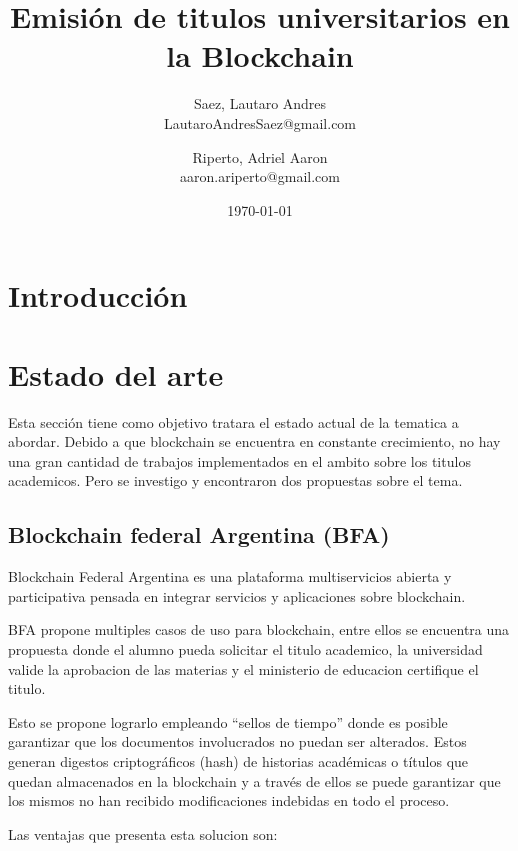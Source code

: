 \documentclass[11pt,a4paper]{article}
\title{ 
    Emisión de titulos universitarios
    en la Blockchain
}
\author{
    Saez, Lautaro Andres \\ \small{ LautaroAndresSaez@gmail.com } 
    \and 
    Riperto, Adriel Aaron \\ \small{ aaron.ariperto@gmail.com } 
}
\date{\today}
\begin{document}
    \maketitle

    \section{Introducción}

    \section{Estado del arte}

        Esta sección tiene como objetivo tratara el estado actual de la tematica a abordar.
        Debido a que blockchain se encuentra en constante crecimiento, no hay una gran cantidad 
        de trabajos implementados en el ambito sobre los titulos academicos. Pero se investigo 
        y encontraron dos propuestas sobre el tema. %

        \subsection{Blockchain federal Argentina (BFA)}


        Blockchain Federal Argentina es una plataforma multiservicios abierta y participativa pensada en integrar servicios y aplicaciones
        sobre blockchain. %
        
        BFA propone multiples casos de uso para blockchain, entre ellos se encuentra una propuesta donde el alumno pueda solicitar
        el titulo academico, la universidad valide la aprobacion de las materias y el ministerio de educacion certifique el titulo.

        Esto se propone lograrlo empleando “sellos de tiempo” donde es posible garantizar que los documentos involucrados 
        no puedan ser alterados. Estos generan digestos criptográficos (hash) de historias académicas o títulos que quedan 
        almacenados en la blockchain y a través de ellos se puede garantizar que los mismos no han recibido modificaciones 
        indebidas en todo el proceso. %

        Las ventajas que presenta esta solucion son:
        
\end{document}
